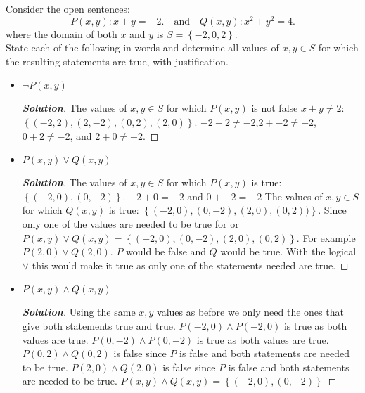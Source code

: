 \documentclass[11pt]{article}
\newenvironment{problem}[2][Problem\!]{\begin{trivlist}
\item[\hskip \labelsep {\bfseries #1}\hskip \labelsep {\bfseries #2.}]}{\end{trivlist}}
\newenvironment{solution}{\begin{proof}[\textbf{\textit{Solution}}]}{\end{proof}}
\newcommand{\set}[1]{\left\{#1\right\}} %
\begin{document}
\newpage %

\begin{problem}{2.2}
Consider the open sentences:
\[P(x,y) : x+y = -2. \quad \text{and} \quad Q(x,y) : x^2 + y^2 = 4.\]
where the domain of both $x$ and $y$ is $S = \set{-2, 0, 2}$.\\[0.5em]
State each of the following in words and determine all values of $x,y \in S$ for which the resulting statements are true, with justification.
\begin{itemize}[itemsep=3em]
\item[(a)] $\neg P(x,y)$
\begin{solution}
The values of \(x,y \in S\) for which \(P(x, y)\) is not false \(x + y \not= 2\): \(\set{(-2, 2), (2,-2), (0, 2), (2,0)}\). \(-2 + 2 \not= -2\),\(2 + -2 \not= -2\),\(0 + 2 \not= -2\), and \(2 + 0 \not= -2\).
\end{solution}

\item[(b)] $P(x,y) \lor Q(x,y)$
\begin{solution}
The values of \(x,y \in S\) for which \(P(x, y)\) is true: \(\set{(-2, 0), (0, -2)}\). \(-2 + 0 = -2\) and \(0 + -2 = -2\)
The values of \(x,y \in S\) for which \(Q(x, y)\) is true: \(\set{(-2, 0), (0, -2), (2, 0), (0,2))}\). Since only one of the values are needed to be true for or \(P(x,y) \lor Q(x,y) = \set{(-2,0),(0,-2),(2,0),(0,2)}\). For example \(P(2,0) \lor Q(2,0)\). \(P\) would be false and \(Q\) would be true. With the logical \(\lor\) this would make it true as only one of the statements needed are true.
\end{solution}

\item[(c)] $P(x,y) \land Q(x,y)$
\begin{solution}
Using the same \(x,y\) values as before we only need the ones that give both statements true and true. \(P(-2,0) \land P(-2,0)\) is true as both values are true. \(P(0,-2) \land P(0,-2)\) is true as both values are true. \(P(0,2) \land Q(0,2)\) is false since \(P\) is false and both statements are needed to be true. \(P(2,0) \land Q(2,0)\) is false since \(P\) is false and both statements are needed to be true. \(P(x,y) \land Q(x,y) = \set{(-2,0),(0,-2)}\)
\end{solution}


\end{itemize}
\end{problem}
\end{document}
